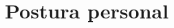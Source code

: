 \documentclass[
	spanish,
	letterpaper, oneside
]{article}
\begin{document}



\section{Postura personal}
\end{document}

